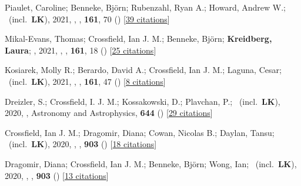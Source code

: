 \item[{\color{numcolor}\scriptsize49}] Piaulet, Caroline; Benneke, Bj{\"o}rn; Rubenzahl, Ryan A.; Howard, Andrew W.; \etal\ (incl.\ \textbf{LK}), 2021, , \aj, \textbf{161}, 70 () [\href{https://ui.adsabs.harvard.edu/abs/2021AJ....161...70P}{39 citations}]

\item[{\color{numcolor}\scriptsize48}] Mikal-Evans, Thomas; Crossfield, Ian J. M.; Benneke, Bj{\"o}rn; \textbf{Kreidberg, Laura}; \etal, 2021, , \aj, \textbf{161}, 18 () [\href{https://ui.adsabs.harvard.edu/abs/2021AJ....161...18M}{25 citations}]

\item[{\color{numcolor}\scriptsize47}] Kosiarek, Molly R.; Berardo, David A.; Crossfield, Ian J. M.; Laguna, Cesar; \etal\ (incl.\ \textbf{LK}), 2021, , \aj, \textbf{161}, 47 () [\href{https://ui.adsabs.harvard.edu/abs/2021AJ....161...47K}{8 citations}]

\item[{\color{numcolor}\scriptsize46}] Dreizler, S.; Crossfield, I. J. M.; Kossakowski, D.; Plavchan, P.; \etal\ (incl.\ \textbf{LK}), 2020, , Astronomy and Astrophysics, \textbf{644} () [\href{https://ui.adsabs.harvard.edu/abs/2020A&A...644A.127D}{29 citations}]

\item[{\color{numcolor}\scriptsize45}] Crossfield, Ian J. M.; Dragomir, Diana; Cowan, Nicolas B.; Daylan, Tansu; \etal\ (incl.\ \textbf{LK}), 2020, , \apj, \textbf{903} () [\href{https://ui.adsabs.harvard.edu/abs/2020ApJ...903L...7C}{18 citations}]

\item[{\color{numcolor}\scriptsize44}] Dragomir, Diana; Crossfield, Ian J. M.; Benneke, Bj{\"o}rn; Wong, Ian; \etal\ (incl.\ \textbf{LK}), 2020, , \apj, \textbf{903} () [\href{https://ui.adsabs.harvard.edu/abs/2020ApJ...903L...6D}{13 citations}]

